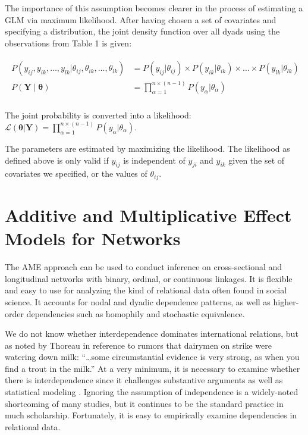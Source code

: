 \documentclass[12pt]{amsart}
\begin{document}
The importance of this assumption becomes clearer in the process of estimating a GLM via maximum likelihood. After having chosen a set of covariates and specifying a distribution, the joint density function over all dyads using the observations from Table 1 is given:

\vspace{-8mm}
\begin{align}
\begin{aligned}
	P(y_{ij}, y_{ik}, \ldots, y_{lk} | \theta_{ij}, \theta_{ik}, \ldots, \theta_{lk}) &= P(y_{ij} | \theta_{ij}) \times P(y_{ik} | \theta_{ik}) \times \ldots \times P(y_{lk} | \theta_{lk}) \\
	P(\mathbf{Y} \; | \; \bm{\theta}) &= \prod_{\alpha=1}^{n \times (n-1)} P(y_{\alpha} | \theta_{\alpha})  \\
\end{aligned}
\end{align}

\noindent The joint probability is converted into a likelihood: $\displaystyle \mathcal{L} (\bm{\theta} | \mathbf{Y}) = \prod_{\alpha=1}^{n \times (n-1)} P(y_{\alpha} | \theta_{\alpha})$.

The parameters are estimated by maximizing the likelihood. The likelihood as defined above is only valid if  $y_{ij}$ is independent of $y_{ji}$ and $y_{ik}$ given the set of covariates we specified, or the values of $\theta_{ij}$.

\section{\textbf{Additive and Multiplicative Effect Models for Networks}}

The AME approach can be used to conduct inference on cross-sectional and longitudinal networks with binary, ordinal, or continuous linkages. It is flexible and easy to use for analyzing the kind of relational data often found in social science.  It accounts for nodal and dyadic dependence patterns, as well as higher-order dependencies such as homophily and stochastic equivalence. 

We do not know whether interdependence dominates international relations, but as noted by Thoreau in reference to rumors that dairymen on strike were watering down milk: ``\ldots some circumstantial evidence is very strong, as when you find a trout in the milk.''  At a very minimum, it is necessary to examine whether there is interdependence since it challenges substantive arguments as well as statistical modeling \citep{snijders:2011}. Ignoring the assumption of independence is a widely-noted shortcoming of many studies, but it continues to be the standard practice in much scholarship. Fortunately, it is easy to empirically examine dependencies in relational data.
\end{document}
